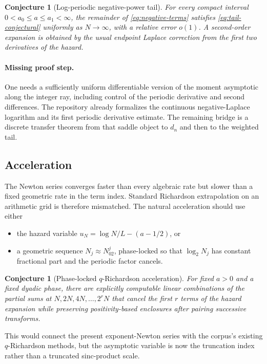 \documentclass[11pt,oneside]{article}
\numberwithin{equation}{section}
\newtheorem{conjecture}[theorem]{Conjecture}
\theoremstyle{definition}
\theoremstyle{remark}
\begin{document}
\begin{conjecture}[Log-periodic negative-power tail]
\label{conj:tail}
For every compact interval $0<a_0\le a\le a_1<\infty$, the remainder of
\eqref{eq:negative-terms} satisfies \eqref{eq:tail-conjectural} uniformly as $N\to\infty$,
with a relative error $o(1)$.  A second-order expansion is obtained by the usual endpoint
Laplace correction from the first two derivatives of the hazard.
\end{conjecture}

\paragraph{Missing proof step.}
One needs a sufficiently uniform differentiable version of the moment asymptotic along the
integer ray, including control of the periodic derivative and second differences.  The
repository already formalizes the continuous negative-Laplace logarithm and its first
periodic derivative estimate.  The remaining bridge is a discrete transfer theorem from
that saddle object to $d_n$ and then to the weighted tail.

\subsection{Acceleration}

The Newton series converges faster than every algebraic rate but slower than a fixed
geometric rate in the term index.  Standard Richardson extrapolation on an arithmetic grid
is therefore mismatched.  The natural acceleration should use either

\begin{itemize}
\item the hazard variable $u_N=\log N/L-(a-1/2)$, or
\item a geometric sequence $N_j\approx N_02^j$, phase-locked so that
      $\log_2N_j$ has constant fractional part and the periodic factor cancels.
\end{itemize}

\begin{conjecture}[Phase-locked $q$-Richardson acceleration]
For fixed $a>0$ and a fixed dyadic phase, there are explicitly computable linear
combinations of the partial sums at $N,2N,4N,\ldots,2^rN$ that cancel the first $r$
terms of the hazard expansion while preserving positivity-based enclosures after pairing
successive transforms.
\end{conjecture}

This would connect the present exponent-Newton series with the corpus's existing
$q$-Richardson methods, but the asymptotic variable is now the truncation index rather than a
truncated sinc-product scale.
\end{document}
